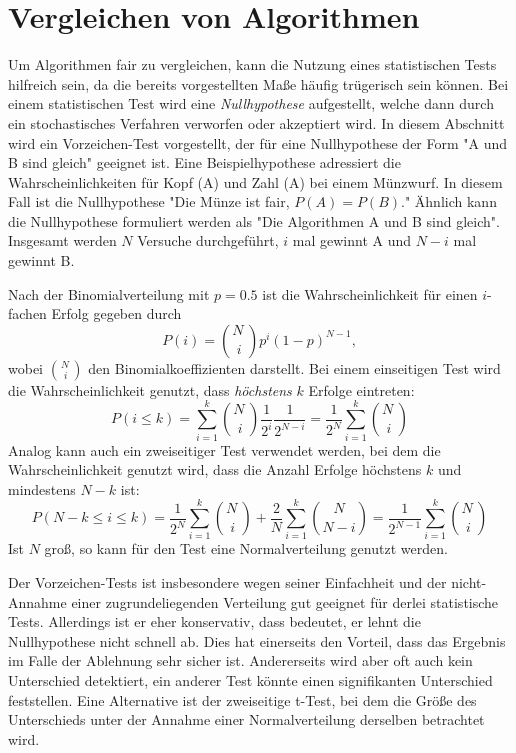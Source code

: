 	\section{Vergleichen von Algorithmen}  %
		Um Algorithmen fair zu vergleichen, kann die Nutzung eines statistischen Tests hilfreich sein, da die bereits vorgestellten Maße häufig trügerisch sein können. Bei einem statistischen Test wird eine \emph{Nullhypothese} aufgestellt, welche dann durch ein stochastisches Verfahren verworfen oder akzeptiert wird. In diesem Abschnitt wird ein Vorzeichen-Test vorgestellt, der für eine Nullhypothese der Form "A und B sind gleich" geeignet ist. Eine Beispielhypothese adressiert die Wahrscheinlichkeiten für Kopf (A) und Zahl (A) bei einem Münzwurf. In diesem Fall ist die Nullhypothese "Die Münze ist fair, \dh \( P(A) = P(B) \)." Ähnlich kann die Nullhypothese formuliert werden als "Die Algorithmen A und B sind gleich". Insgesamt werden \(N\) Versuche durchgeführt, \(i\) mal gewinnt A und \(N - i\) mal gewinnt B.

		Nach der Binomialverteilung mit \(p = 0.5\) ist die Wahrscheinlichkeit für einen \(i\)-fachen Erfolg gegeben durch
		\begin{equation}
			P(i) = {N\, \choose i} p^i (1 - p)^{N - 1},
		\end{equation}
		wobei \( N\, \choose i \) den Binomialkoeffizienten darstellt. Bei einem einseitigen Test wird die Wahrscheinlichkeit genutzt, dass \emph{höchstens} \(k\) Erfolge eintreten:
		\begin{equation}
			P(i \leq k) = \sum_{i = 1}^{k} {N\, \choose i} \frac{1}{2^i} \frac{1}{2^{N - i}} = \frac{1}{2^N} \sum_{i = 1}^{k} {N\, \choose i}
		\end{equation}
		Analog kann auch ein zweiseitiger Test verwendet werden, bei dem die Wahrscheinlichkeit genutzt wird, dass die Anzahl Erfolge höchstens \(k\) und mindestens \(N - k\) ist:
		\begin{equation}
			P(N - k \leq i \leq k) = \frac{1}{2^N} \sum_{i = 1}^{k} {N\, \choose i} + \frac{2}{N} \sum_{i = 1}^{k} {N \choose N - i} = \frac{1}{2^{N - 1}} \sum_{i = 1}^{k} {N\, \choose i}
		\end{equation}
		Ist \(N\) groß, so kann für den Test eine Normalverteilung genutzt werden.

		Der Vorzeichen-Tests ist insbesondere wegen seiner Einfachheit und der nicht-Annahme einer zugrundeliegenden Verteilung gut geeignet für derlei statistische Tests. Allerdings ist er eher konservativ, dass bedeutet, er lehnt die Nullhypothese nicht schnell ab. Dies hat einerseits den Vorteil, dass das Ergebnis im Falle der Ablehnung sehr sicher ist. Andererseits wird aber oft auch kein Unterschied detektiert, \dh ein anderer Test könnte einen signifikanten Unterschied feststellen. Eine Alternative ist der zweiseitige t-Test, bei dem die Größe des Unterschieds unter der Annahme einer Normalverteilung derselben betrachtet wird.

